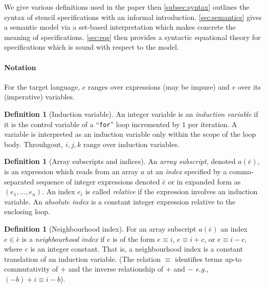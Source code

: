 \documentclass[10pt,preprint,numbers]{sigplanconf}
\newcounter{block}
\theoremstyle{definition}
\newtheorem{definition}[block]{Definition}
\newcommand{\eg}{\emph{e.g.}}
\begin{document}
We give various definitions used in the paper then
\cref{subsec:syntax} outlines the syntax of stencil specifications
with an informal introduction. \cref{sec:semantics}
gives a semantic model via a set-based interpretation which makes
concrete the meaning of specifications. \cref{sec:eqs} then provides
a syntactic equational theory for specifications which is
sound with respect to the model.


\paragraph{Notation}

\renewcommand*{\arraystretch}{0.8}
For the target language, $e$ ranges over expressions (may be impure) and $v$
over its (imperative) variables. %

\begin{definition}[Induction variable]
  An integer variable is an \emph{induction variable} if it is the control
  variable of a ``\texttt{for}'' loop incremented by $1$ per iteration. A variable
  is interpreted as an induction variable only within the scope of the loop
  body. Throuhgout, $i, j, k$ range over induction variables.
\end{definition}

\begin{definition}[Array subscripts and indices]
  An \emph{array subscript}, denoted $a(\bar{e})$, is an expression
  which reads from an array $a$ at an \emph{index} specified by a
  comma-separated sequence of integer expressions denoted $\bar{e}$ or
  in expanded form as $(e_1, \ldots, e_n)$. An index $e_i$
  is called \emph{relative} if the expression involves an induction
  variable.
  An \emph{absolute index} is a constant integer expression relative to the
  enclosing loop.
\end{definition}

\begin{definition}[Neighbourhood index]
\label{def:neighbour}
  For an array subscript $a(\bar{e})$ an index $e \in \bar{e}$ is a
  \emph{neighbourhood index} if $e$ is of the form $e \equiv i$, $e \equiv i +
  c$, or $e \equiv i - c$, where $c$ is an integer constant. That is, a
  neighbourhood index is a constant translation of an induction variable. (The
  relation $\equiv$ identifies terms up-to commutativity of $+$ and the inverse
  relationship of $+$ and $-$ \eg{}, $(-b) + i \equiv i - b$).
\end{definition}
\end{document}
